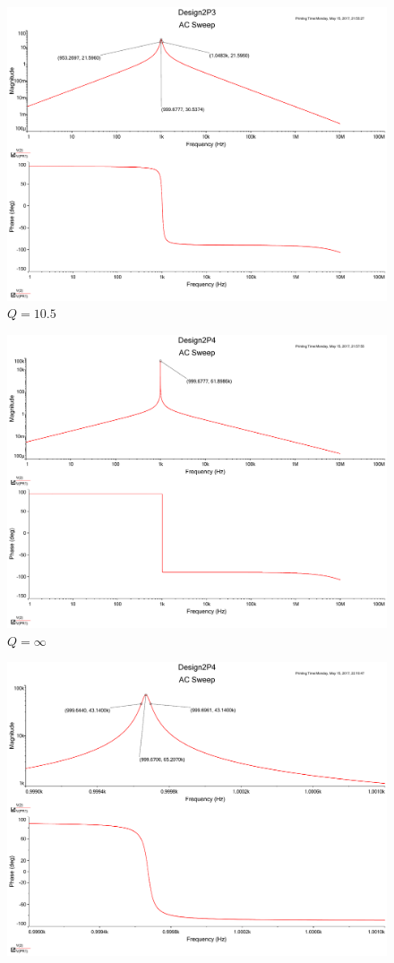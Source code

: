 \documentclass[UTF8,a4paper]{paper}
\begin{document}
\begin{multicols}{2}
\begin{figure}[H]
\includegraphics[width=\columnwidth]{2P10_5.pdf}
\caption{$Q=10.5$}
\label{PQ10}
\end{figure}
\begin{figure}[H]
\centering
\includegraphics[width=\columnwidth]{2Pinf.pdf}
\caption{$Q=\infty$}
\label{PQinf}
\end{figure}
\begin{figure}[H]
\centering
\includegraphics[width=\columnwidth]{2Pinf_1.pdf}

\end{figure}
\end{multicols}
\end{document}
